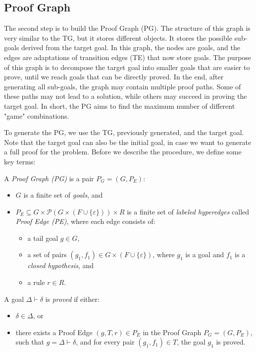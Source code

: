 \subsection{Proof Graph}
The second step is to build the Proof Graph (PG). The structure of this graph is very similar to the TG, but it stores different objects. It stores the possible sub-goals derived from the target goal. In this graph, the nodes are goals, and the edges are adaptations of transition edges (TE) that now store goals. The purpose of this graph is to decompose the target goal into smaller goals that are easier to prove, until we reach goals that can be directly proved. In the end, after generating all sub-goals, the graph may contain multiple proof paths. Some of these paths may not lead to a solution, while others may succeed in proving the target goal. In short, the PG aims to find the maximum number of different "game" combinations.

To generate the PG, we use the TG, previously generated, and the target goal. Note that the target goal can also be the initial goal, in case we want to generate a full proof for the problem. Before we describe the procedure, we define some key terms:

\begin{definition}
A \emph{Proof Graph (PG)} is a pair $P_G = (G, P_E)$:
\begin{itemize}
  \item \( G \) is a finite set of \emph{goals}, and
  \item \( P_E \subseteq G \times \mathcal{P}(G \times (F \cup \{\varepsilon\})) \times R \) is a finite set of \emph{labeled hyperedges} called \emph{Proof Edge (PE)}, where each edge consists of:
  \begin{itemize}
    \item a tail goal \( g \in G \),
    \item a set of pairs \( (g_1, f_1) \in G \times (F \cup \{\varepsilon\}) \), where \( g_1 \) is a goal and \( f_1 \) is a \emph{closed hypothesis}, and
    \item a rule \( r \in R \).
  \end{itemize}
\end{itemize}
\end{definition}

\begin{definition}
A goal \( \Delta \vdash \delta \) is \emph{proved} if either:
\begin{itemize}
  \item \( \delta \in \Delta \), or
  \item there exists a Proof Edge \( (g, T, r) \in P_E \) in the Proof Graph \( P_G = (G, P_E) \), such that \( g = \Delta \vdash \delta \), and for every pair \( (g_1, f_1) \in T \), the goal \( g_1 \) is proved.
\end{itemize}
\end{definition}

